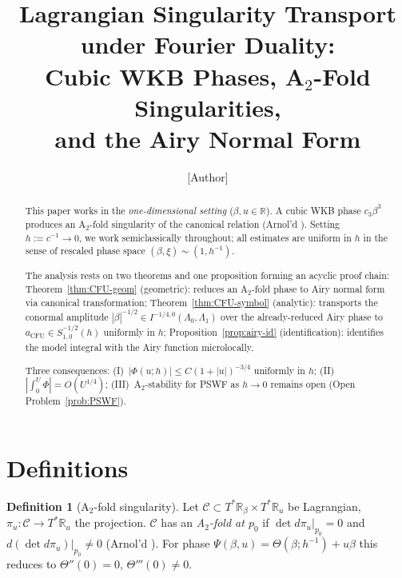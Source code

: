 \documentclass[12pt,a4paper]{amsart}
\theoremstyle{definition}
\newtheorem{definition}[theorem]{Definition}
\theoremstyle{remark}
\begin{document}
\title[Lagrangian Singularity Transport under Fourier Duality]{%
  Lagrangian Singularity Transport under Fourier Duality:\\
  Cubic WKB Phases, A$_2$-Fold Singularities,\\
  and the Airy Normal Form}

\author{[Author]}

\begin{abstract}
This paper works in the \emph{one-dimensional setting}
($\beta,u\in\mathbb{R}$).
A cubic WKB phase $c_3\beta^3$ produces an A$_2$-fold
singularity of the canonical relation (Arnol'd \cite{Arnold1972}).
Setting $h := c^{-1} \to 0$, we work semiclassically throughout;
all estimates are uniform in $h$ in the sense of rescaled
phase space $(\beta,\xi)\sim(1,h^{-1})$.

The analysis rests on two theorems and one proposition
forming an acyclic proof chain:
Theorem~\ref{thm:CFU-geom} (geometric): reduces an A$_2$-fold
phase to Airy normal form via canonical transformation;
Theorem~\ref{thm:CFU-symbol} (analytic): transports the conormal
amplitude $|\beta|^{-1/2}\in I^{-1/4,0}(\Lambda_0,\Lambda_1)$
over the already-reduced Airy phase to
$a_{\mathrm{CFU}}\in S^{-1/2}_{1,0}(h)$ uniformly in $h$;
Proposition~\ref{prop:airy-id} (identification): identifies the
model integral with the Airy function microlocally.

Three consequences:
(I)~$|\Phi(u;h)|\le C(1+|u|)^{-3/4}$ uniformly in $h$;
(II)~$|\int_0^U\Phi|=O(U^{1/4})$;
(III)~A$_2$-stability for PSWF as $h\to 0$ remains open
(Open Problem~\ref{prob:PSWF}).
\end{abstract}

\maketitle

\section{Definitions}
\label{sec:defs}

\begin{definition}[A$_2$-fold singularity]\label{def:A2}
Let $\mathcal{C}\subset T^*\mathbb{R}_\beta\times T^*\mathbb{R}_u$
be Lagrangian, $\pi_u:\mathcal{C}\to T^*\mathbb{R}_u$ the projection.
$\mathcal{C}$ has an \emph{A$_2$-fold at $p_0$} if
$\det d\pi_u|_{p_0}=0$ and $d(\det d\pi_u)|_{p_0}\ne 0$
(Arnol'd \cite{Arnold1972}).
For phase $\Psi(\beta,u)=\Theta(\beta;h^{-1})+u\beta$
this reduces to $\Theta''(0)=0$, $\Theta'''(0)\ne 0$.
\end{definition}
\end{document}
